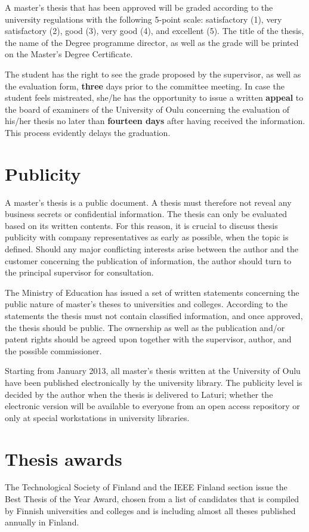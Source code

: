 A master’s thesis that has been approved will be graded according to the university regulations with the following 5-point scale: satisfactory (1), very satisfactory (2), good (3), very good (4), and excellent (5). The title of the thesis, the name of the Degree programme director, as well as the grade will be printed on the Master’s Degree Certificate.

The student has the right to see the grade proposed by the supervisor, as well as the evaluation form, \textbf{three} days prior to the committee meeting. In case the student feels mistreated, she/he has the opportunity to issue a written \textbf{appeal} to the board of examiners of the University of Oulu concerning the evaluation of his/her thesis no later than \textbf{fourteen days} after having received the information. This process evidently delays the graduation.

\section{Publicity}
\label{sec:publicity}

A master’s thesis is a public document. A thesis must therefore not reveal any business secrets or confidential information. The thesis can only be evaluated based on its written contents. For this reason, it is crucial to discuss thesis publicity with company representatives as early as possible, when the topic is defined. Should any major conflicting interests arise between the author and the customer concerning the publication of information, the author should turn to the principal supervisor for consultation.

The Ministry of Education has issued a set of written statements concerning the public nature of master’s theses to universities and colleges. According to the statements the thesis must not contain classified information, and once approved, the thesis should be public. The ownership as well as the publication and/or patent rights should be agreed upon together with the supervisor, author, and the possible commissioner.

Starting from January 2013, all master’s thesis written at the University of Oulu have been published electronically by the university library. The publicity level is decided by the author when the thesis is delivered to Laturi; whether the electronic version will be available to everyone from an open access repository or only at special workstations in university libraries.

\section{Thesis awards}

The Technological Society of Finland and the IEEE Finland section issue the Best Thesis of the Year Award, chosen from a list of candidates that is compiled by Finnish universities and colleges and is including almost all theses published annually in Finland.
